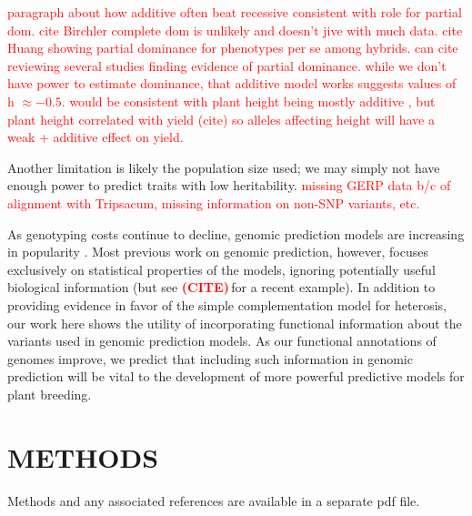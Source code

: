 \documentclass[twoside, twocolumn, letterpaper]{article}
\newcommand{\citex}{\textcolor{red}{\bf (CITE)\,}}
\newcommand{\out}[1]{\textcolor{red}{#1}} %
\begin{document}
\out{paragraph about how additive often beat recessive  consistent with role for partial dom. cite Birchler complete dom is unlikely and doesn't jive with much data. cite Huang showing partial dominance for phenotypes per se among hybrids. can cite \citep{halligan2009spontaneous} reviewing several studies finding evidence of partial dominance. while we don't have power to estimate dominance, that additive model works  suggests values of h $\approx -0.5$. 	 would be consistent with plant height  being mostly additive \citep{peiffer2014genetic}, but plant height correlated with yield (cite) so alleles affecting height will have a weak +  additive effect on yield.  }


Another limitation is likely the population size used; we may simply not have enough power to predict traits with low heritability. \out{missing GERP data b/c of alignment with Tripsacum, missing information on non-SNP variants, etc.}

As genotyping costs continue to decline, genomic prediction models are increasing in popularity \citep{desta2014genomic}. 
Most previous work on genomic prediction, however, focuses exclusively on statistical properties of the models, ignoring potentially useful biological information (but see \citex for a recent example). 
In addition to providing evidence in favor of the simple complementation model for heterosis, our work here shows the utility of incorporating functional information about the variants used in genomic prediction models.  
As our functional annotations of genomes improve, we predict that including such information in genomic prediction will be vital to the development of more powerful predictive models for plant breeding.

\section*{METHODS}
Methods and any associated references are available in a separate pdf file.
\end{document}
